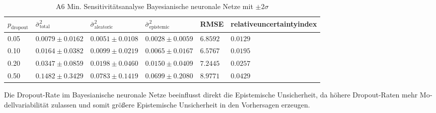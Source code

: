 \begin{otherlanguage}{ngerman}
\newline

\begin{table}[!htbp]
\centering
\footnotesize
\begin{tabularx}{\textwidth}{|X|X|X|X|X|X|}
\hline
\vspace{0.15em}$p_{\text{dropout}}$\vspace{0.25em} 
&\vspace{0.15em} $\bar{\sigma}^2_{\text{total}}$\vspace{0.25em}
&\vspace{0.15em} $\bar{\sigma}^2_{\text{aleatoric}}$\vspace{0.25em}
&\vspace{0.15em} $\bar{\sigma}^2_{\text{epistemic}}$\vspace{0.25em}
&\vspace{0.15em} RMSE \vspace{0.25em}
&\vspace{0.15em} \gls{relativeuncertaintyindex}\vspace{0.25em} \\
\hline
0.05 & $0.0079 \pm 0.0162$ & $0.0051 \pm 0.0108$ & $0.0028 \pm 0.0059$ & $6.8592$ & $0.0129$ \\
\hline
0.10 & $0.0164 \pm 0.0382$ & $0.0099 \pm 0.0219$ & $0.0065 \pm 0.0167$ & $6.5767$ & $0.0195$ \\
\hline
0.20 & $0.0347 \pm 0.0859$ & $0.0198 \pm 0.0460$ & $0.0150 \pm 0.0409$ & $7.2445$ & $0.0257$ \\
\hline
0.50 & $0.1482 \pm 0.3429$ & $0.0783 \pm 0.1419$ & $0.0699 \pm 0.2080$ & $8.9771$ & $0.0429$ \\
\hline
\end{tabularx}
\caption{A6 Min. Sensitivitätsanalyse \gls{Bayesianische neuronale Netze} mit $\pm 2\sigma$}
\label{tab:bnn_results}
\end{table} 

Die Dropout-Rate im \gls{Bayesianische neuronale Netze} beeinflusst direkt die \gls{Epistemische Unsicherheit}, da höhere Dropout-Raten mehr Modellvariabilität zulassen und somit größere \gls{Epistemische Unsicherheit} in den Vorhersagen erzeugen.

\newline


\end{otherlanguage}
